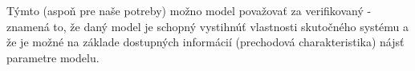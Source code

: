 \documentclass[a4paper, 10pt, ]{article}
\begin{document}
\begin{figure}[t]
	\centering


    \vspace{-4mm}

	\caption{}
	\label{graf40}

\end{figure}

Týmto (aspoň pre naše potreby) možno model považovať za verifikovaný - znamená to, že daný model je schopný vystihnúť vlastnosti skutočného systému a že je možné na základe dostupných informácií (prechodová charakteristika) nájsť parametre modelu.
\end{document}
